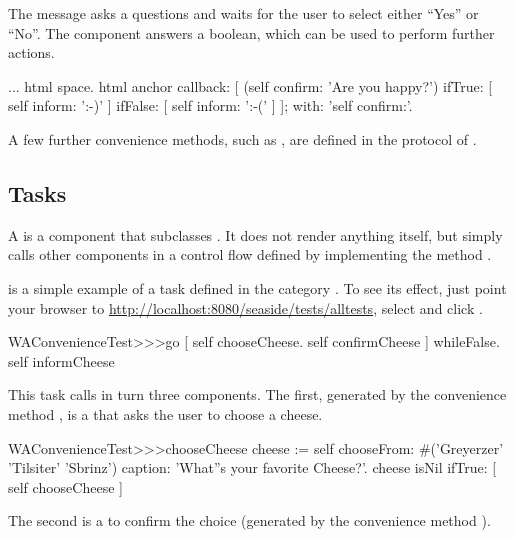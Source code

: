 \documentclass[a4paper,10pt,twoside]{book}
\begin{document}
{{The message  asks a questions and waits for the user to select either ``Yes'' or ``No''.
The component answers a boolean, which can be used to perform further actions.

\begin{code}{}
...
	html space.
	html anchor
		callback: [
			(self confirm: 'Are you happy?')
				ifTrue: [ self inform: ':-)' ]
				ifFalse: [ self inform: ':-(' ]
			];
		with: 'self confirm:'.
\end{code}

A few further convenience methods, such as , are defined in the  protocol of .

\subsection{Tasks}

A  is a component that subclasses .
It does not render anything itself, but simply calls other components in a control flow defined by implementing the method .

 is a simple example of a task defined in the category .
To see its effect, just point your browser to \url{http://localhost:8080/seaside/tests/alltests}, select  and click .

\begin{code}{}
WAConvenienceTest>>>go
	[ self chooseCheese.
	  self confirmCheese ] whileFalse.
	self informCheese
\end{code}

This task calls in turn three components.
The first, generated by the convenience method , is a  that asks the user to choose a cheese.

\begin{code}{}
WAConvenienceTest>>>chooseCheese
	cheese := self
		chooseFrom: #('Greyerzer' 'Tilsiter' 'Sbrinz')
		caption: 'What''s your favorite Cheese?'.
	cheese isNil ifTrue: [ self chooseCheese ]
\end{code}


The second is a  to confirm the choice (generated by the convenience method ).

}}
\end{document}
